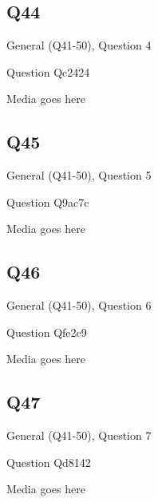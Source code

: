 \documentclass[11pt]{beamer}
\begin{document}
\subsection*{Q44}
\begin{frame}[t]{General (Q41-50), Question 4}
\vspace{2em}
\begin{block}{Question}
Qc2424
\end{block}
\begin{center}
Media goes here
\end{center}
\end{frame}
    

\subsection*{Q45}
\begin{frame}[t]{General (Q41-50), Question 5}
\vspace{2em}
\begin{block}{Question}
Q9ac7c
\end{block}
\begin{center}
Media goes here
\end{center}
\end{frame}
    

\subsection*{Q46}
\begin{frame}[t]{General (Q41-50), Question 6}
\vspace{2em}
\begin{block}{Question}
Qfe2c9
\end{block}
\begin{center}
Media goes here
\end{center}
\end{frame}
    

\subsection*{Q47}
\begin{frame}[t]{General (Q41-50), Question 7}
\vspace{2em}
\begin{block}{Question}
Qd8142
\end{block}
\begin{center}
Media goes here
\end{center}
\end{frame}
    
\end{document}
